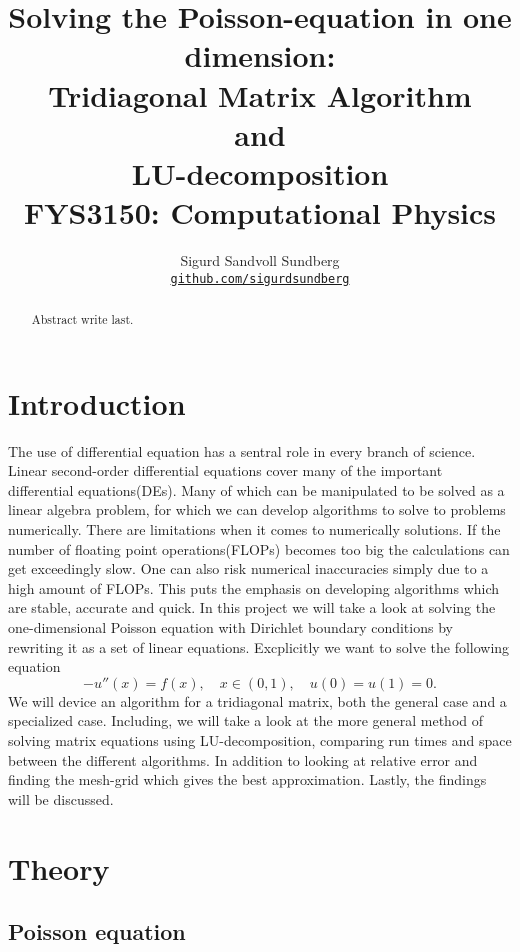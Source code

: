 \documentclass[10pt, a4paper]{amsart}
\title[Solving the Poisson-equation in one dimension]{Solving the Poisson-equation in one dimension: \\
\normalsize{Tridiagonal Matrix Algorithm\\
 and \\
 LU-decomposition} \\
  \hrulefill\small{ FYS3150: Computational Physics }\hrulefill}
\author[Sundberg]{Sigurd Sandvoll Sundberg \\
  \href{https://https://github.com/SigurdSundberg/FYS3150/}{\texttt{github.com/sigurdsundberg}}}
\begin{document}
\begin{titlepage}
\begin{abstract}
Abstract write last.
\end{abstract}
\maketitle
\tableofcontents
\end{titlepage}

\section{Introduction}
The use of differential equation has a sentral role in every branch of science. Linear second-order differential equations cover many of the important differential equations(DEs). Many of which can be manipulated to be solved as a linear algebra problem, for which we can develop algorithms to solve to problems numerically. There are limitations when it comes to numerically solutions. If the number of floating point operations(FLOPs) becomes too big the calculations can get exceedingly slow. One can also risk numerical inaccuracies simply due to a high amount of FLOPs. This puts the emphasis on developing algorithms which are stable, accurate and quick. 
In this project we will take a look at solving the one-dimensional Poisson equation with Dirichlet boundary conditions by rewriting it as a set of linear equations. Excplicitly we want to solve the following equation
\begin{equation}
-u''(x) = f(x), \quad x\in(0,1), \quad u(0)=u(1)=0.\label{eq:base}
\end{equation}
We will device an algorithm for a tridiagonal matrix, both the general case and a specialized case. Including, we will take a look at the more general method of solving matrix equations using LU-decomposition, comparing run times and space between the different algorithms. In addition to looking at relative error and finding the mesh-grid which gives the best approximation. Lastly, the findings will be discussed. 

\section{Theory}
\subsection{Poisson equation}
\end{document}
